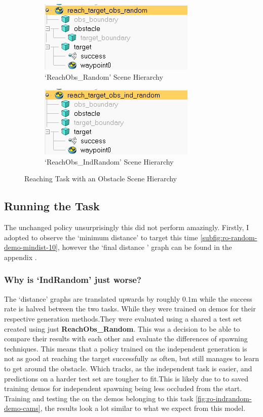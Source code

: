 \begin{figure}[htpb] %
  \centering
  \begin{subfigure}{0.4\textwidth}
    \centering
    \includegraphics[width=0.3\linewidth]{assets/early-work/obs-random-scene-hierarchy.png}
    \caption{`ReachObs\_Random' Scene Hierarchy}
  \end{subfigure}
  \hfill

  \begin{subfigure}{0.4\textwidth}
    \centering
    \includegraphics[width=0.3\linewidth]{assets/early-work/obs-ind-random-scene-hierarchy.png}
    \caption{`ReachObs\_IndRandom' Scene Hierarchy}
  \end{subfigure}
  \caption{Reaching Task with an Obstacle Scene Hierarchy}\label{fig:reach-obs-random2}
\end{figure}%

\subsection{Running the Task}
The unchanged policy unsurprisingly this did not perform amazingly. Firstly, I adopted to observe the `minimum distance' to target this time \ref{subfig:ro-random-demo-mindist-10}, however the `final distance ' graph can be found in the appendix . 

\subsubsection{Why is `IndRandom' just worse?}
The `distance' graphs are translated upwards by roughly $0.1$m while the success rate is halved between the two tasks. While they were trained on demos for their respective generation methods.They were evaluated using a shared a test set created using just \textbf{ReachObs\_Random}. This was a decision to be able to compare their results with each other and evaluate the differences of spawning techniques.
This means that a policy trained on the independent generation is not as good at reaching the target successfully as often, but still manages to learn to get around the obstacle. Which tracks, as the independent task is easier, and predictions on a harder test set are tougher to fit.This is likely due to to saved training demos for independent spawning being less occluded from the start. Training and testing the on the demos belonging to this task \ref{fig:ro-indrandom-demo-cams}, the results look a lot similar to what we expect from this model.


